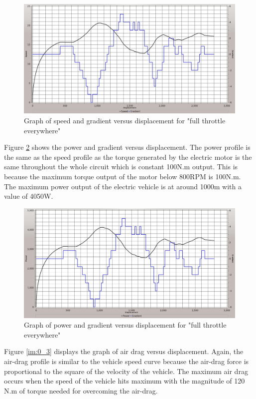 \begin{figure}[htb]
	\centering
	\includegraphics[width=6in]{images/0_1.jpg}
	\caption{Graph of speed and gradient versus displacement for "full throttle everywhere"}
	\label{im:0_1}
\end{figure}

Figure \ref{im:0_2} shows the power and gradient versus displacement. The power profile is the same as the speed profile as the torque generated by the electric motor is the same throughout the whole circuit which is constant 100N.m output. This is because the maximum torque output of the motor below 800RPM is 100N.m. The maximum power output of the electric vehicle is at around 1000m with a value of 4050W. 

\begin{figure}[htb]
	\centering
	\includegraphics[width=6in]{images/0_2.jpg}
	\caption{Graph of power and gradient versus displacement for "full throttle everywhere"}
	\label{im:0_2}
\end{figure}

Figure \ref{im:0_3} displays the graph of air drag versus displacement. Again, the air-drag profile is similar to the vehicle speed curve because the air-drag force is proportional to the square of the velocity of the vehicle. The maximum air drag occurs when the speed of the vehicle hits maximum with the magnitude of 120 N.m of torque needed for overcoming the air-drag.

